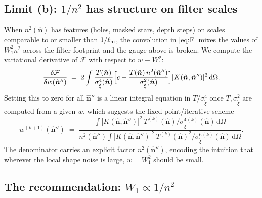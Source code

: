 \documentclass[11pt]{article}
\newcommand{\nv}{\hat{\boldsymbol{n}}}
\newcommand{\dom}{\mathrm{d}\Omega}
\newcommand{\Wone}{W_1}
\begin{document}
\subsection{Limit (b): $1/n^2$ has structure on filter scales}

When $n^2(\nv)$ has features (holes, masked stars, depth steps) on scales
comparable to or smaller than $1/\ell_{\rm hi}$, the convolution in
\cref{eq:F} mixes the values of $\Wone^2 n^2$ across the filter footprint and
the gauge above is broken. We compute the variational derivative of
$\mathcal F$ with respect to $w\equiv \Wone^2$:
\begin{equation}
\frac{\delta\mathcal F}{\delta w(\nv'')}
\;=\;2\int\frac{T(\nv)}{\sigma^4_{\tilde\xi}(\nv)}
\Bigl[c-\frac{T(\nv)\,n^2(\nv'')}{\sigma^2_{\tilde\xi}(\nv)}\Bigr]
|K(\nv,\nv'')|^2\,\dom.
\label{eq:varF}
\end{equation}
Setting this to zero for all $\nv''$ is a linear integral equation in
$T/\sigma^4_{\tilde\xi}$ once $T,\sigma^2_{\tilde\xi}$ are computed from a
given $w$, which suggests the fixed-point/iterative scheme
\begin{equation}
w^{(k+1)}(\nv'')\;=\;
\frac{\int|K(\nv,\nv'')|^2\,T^{(k)}(\nv)/\sigma^4_{\tilde\xi}{}^{(k)}(\nv)\,\dom}
     {n^2(\nv'')\int|K(\nv,\nv'')|^2\,T^{(k)}(\nv)^2/\sigma^6_{\tilde\xi}{}^{(k)}(\nv)\,\dom}.
\label{eq:fixedpoint}
\end{equation}
The denominator carries an explicit factor $n^2(\nv'')$, encoding the
intuition that wherever the local shape noise is large, $w=\Wone^2$ should
be small.

\subsection{The recommendation: $\Wone\propto 1/n^2$}
\end{document}
